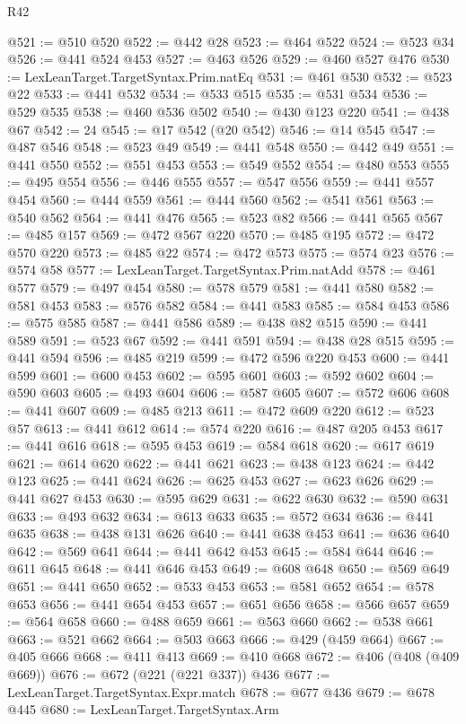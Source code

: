 \begin{lexlean}{R42}
\begin{coremodule}
@521 := @510 @520
@522 := @442 @28
@523 := @464 @522
@524 := @523 @34
@526 := @441 @524 @453
@527 := @463 @526
@529 := @460 @527 @476
@530 := LexLeanTarget.TargetSyntax.Prim.natEq
@531 := @461 @530
@532 := @523 @22
@533 := @441 @532
@534 := @533 @515
@535 := @531 @534
@536 := @529 @535
@538 := @460 @536 @502
@540 := @430 @123 @220
@541 := @438 @67
@542 := 24
@545 := @17 @542 (@20 @542)
@546 := @14 @545
@547 := @487 @546
@548 := @523 @49
@549 := @441 @548
@550 := @442 @49
@551 := @441 @550
@552 := @551 @453
@553 := @549 @552
@554 := @480 @553
@555 := @495 @554
@556 := @446 @555
@557 := @547 @556
@559 := @441 @557 @454
@560 := @444 @559
@561 := @444 @560
@562 := @541 @561
@563 := @540 @562
@564 := @441 @476
@565 := @523 @82
@566 := @441 @565
@567 := @485 @157
@569 := @472 @567 @220
@570 := @485 @195
@572 := @472 @570 @220
@573 := @485 @22
@574 := @472 @573
@575 := @574 @23
@576 := @574 @58
@577 := LexLeanTarget.TargetSyntax.Prim.natAdd
@578 := @461 @577
@579 := @497 @454
@580 := @578 @579
@581 := @441 @580
@582 := @581 @453
@583 := @576 @582
@584 := @441 @583
@585 := @584 @453
@586 := @575 @585
@587 := @441 @586
@589 := @438 @82 @515
@590 := @441 @589
@591 := @523 @67
@592 := @441 @591
@594 := @438 @28 @515
@595 := @441 @594
@596 := @485 @219
@599 := @472 @596 @220 @453
@600 := @441 @599
@601 := @600 @453
@602 := @595 @601
@603 := @592 @602
@604 := @590 @603
@605 := @493 @604
@606 := @587 @605
@607 := @572 @606
@608 := @441 @607
@609 := @485 @213
@611 := @472 @609 @220
@612 := @523 @57
@613 := @441 @612
@614 := @574 @220
@616 := @487 @205 @453
@617 := @441 @616
@618 := @595 @453
@619 := @584 @618
@620 := @617 @619
@621 := @614 @620
@622 := @441 @621
@623 := @438 @123
@624 := @442 @123
@625 := @441 @624
@626 := @625 @453
@627 := @623 @626
@629 := @441 @627 @453
@630 := @595 @629
@631 := @622 @630
@632 := @590 @631
@633 := @493 @632
@634 := @613 @633
@635 := @572 @634
@636 := @441 @635
@638 := @438 @131 @626
@640 := @441 @638 @453
@641 := @636 @640
@642 := @569 @641
@644 := @441 @642 @453
@645 := @584 @644
@646 := @611 @645
@648 := @441 @646 @453
@649 := @608 @648
@650 := @569 @649
@651 := @441 @650
@652 := @533 @453
@653 := @581 @652
@654 := @578 @653
@656 := @441 @654 @453
@657 := @651 @656
@658 := @566 @657
@659 := @564 @658
@660 := @488 @659
@661 := @563 @660
@662 := @538 @661
@663 := @521 @662
@664 := @503 @663
@666 := @429 (@459 @664)
@667 := @405 @666
@668 := @411 @413
@669 := @410 @668
@672 := @406 (@408 (@409 @669))
@676 := @672 (@221 (@221 @337)) @436
@677 := LexLeanTarget.TargetSyntax.Expr.match
@678 := @677 @436
@679 := @678 @445
@680 := LexLeanTarget.TargetSyntax.Arm

\end{coremodule}
\end{lexlean}
